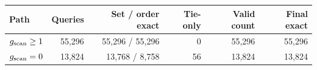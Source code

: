 \begin{tabular}{@{}lrrrrr@{}}
\toprule
Path & Queries & Set / order exact & Tie-only & Valid count & Final exact \\
\midrule
$g_{\mathrm{scan}}\geq1$ & 55,296 & 55,296 / 55,296 & 0 & 55,296 & 55,296 \\
$g_{\mathrm{scan}}=0$ & 13,824 & 13,768 / 8,758 & 56 & 13,824 & 13,824 \\
\bottomrule
\end{tabular}

